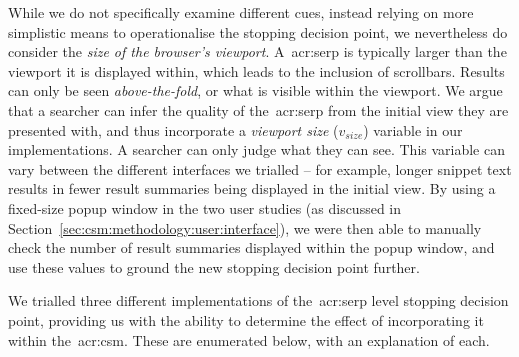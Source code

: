 While we do not specifically examine different cues, instead relying on more simplistic means to operationalise the stopping decision point, we nevertheless do consider the \emph{size of the browser's viewport}. A~\gls{acr:serp} is typically larger than the viewport it is displayed within, which leads to the inclusion of scrollbars. Results can only be seen \emph{above-the-fold}, or what is visible within the viewport. We argue that a searcher can infer the quality of the~\gls{acr:serp} from the initial view they are presented with, and thus incorporate a \emph{viewport size} ($v_{size}$) variable in our implementations. A searcher can only judge what they can see. This variable can vary between the different interfaces we trialled -- for example, longer snippet text results in fewer result summaries being displayed in the initial view. By using a fixed-size popup window in the two user studies (as discussed in Section~\ref{sec:csm:methodology:user:interface}), we were then able to manually check the number of result summaries displayed within the popup window, and use these values to ground the new stopping decision point further.

 We trialled three different implementations of the~\gls{acr:serp} level stopping decision point, providing us with the ability to determine the effect of incorporating it within the~\gls{acr:csm}. These are enumerated below, with an explanation of each.

